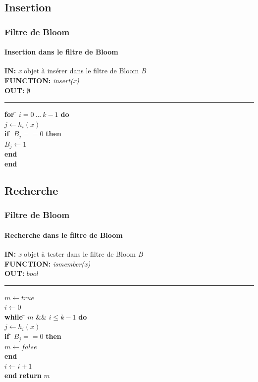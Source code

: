 \documentclass[hyperref={pdfpagemode=FullScreen,colorlinks=true},xcolor=pst,dvips]{beamer}\usepackage[french]{babel}
\begin{document}
	\subsection{Insertion}
	\begin{frame}[shrink]
		\frametitle{Filtre de Bloom}
		\framesubtitle{Insertion dans le filtre de Bloom}
		
		\begin{framed}
		\textbf{IN:} \textit{x} objet à insérer dans le filtre de Bloom \textit{B}\\
		\textbf{FUNCTION:} \textit{insert(x)}\\
		\textbf{OUT:} $\emptyset$
		\noindent\rule{\linewidth}{0.5pt}

		\begin{tabbing}
			\textbf{for} \= $i = 0\ ...\ k - 1$ \textbf{do}\\
					\> $j \leftarrow h_i(x)$\\
					\> \textbf{if} \= $B_j == 0$ \textbf{then}\\
					\> \> $B_j \leftarrow 1$\\
					\> \textbf{end}\\
			\textbf{end}
	    	\end{tabbing}		
	\end{framed}
	\end{frame}
	
	\subsection{Recherche}
	\begin{frame}[shrink]
		\frametitle{Filtre de Bloom}
		\framesubtitle{Recherche dans le filtre de Bloom}
		\begin{framed}
		\textbf{IN:} \emph{x} objet à tester dans le filtre de Bloom \textit{B}\\
		\textbf{FUNCTION:} \textit{ismember(x)}\\
		\textbf{OUT:} $bool$

		\noindent\rule{\linewidth}{0.5pt}

		\begin{tabbing}
			$m \leftarrow true$\\
			$i \leftarrow 0$\\
			\textbf{while} \= $m$ \&\& $i \leq k - 1$ \textbf{do}\\
					\> $j \leftarrow h_i(x)$\\
					\> \textbf{if} \= $B_j == 0$ \textbf{then}\\
					\> \> $m \leftarrow false$\\
					\> \textbf{end}\\
					\> $i \leftarrow i + 1$\\
			\textbf{end}
			\textbf{return} $m$\\
	    	\end{tabbing}		
	\end{framed}
	\end{frame}
	
\end{document}
